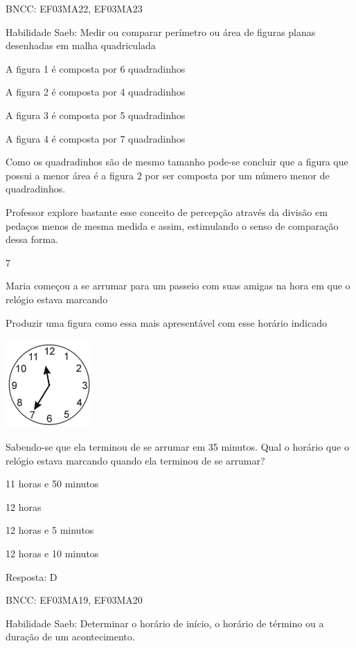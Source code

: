\begin{escolha}
BNCC: EF03MA22, EF03MA23

Habilidade Saeb: Medir ou comparar perímetro ou área de figuras planas
desenhadas em malha quadriculada

A figura 1 é composta por 6 quadradinhos

A figura 2 é composta por 4 quadradinhos

A figura 3 é composta por 5 quadradinhos

A figura 4 é composta por 7 quadradinhos

Como os quadradinhos são de mesmo tamanho pode-se concluir que a figura
que possui a menor área é a figura 2 por ser composta por um número
menor de quadradinhos.

Professor explore bastante esse conceito de percepção através da divisão
em pedaços menos de mesma medida e assim, estimulando o senso de
comparação dessa forma.

\num{7}

Maria começou a se arrumar para um passeio com suas amigas na hora em
que o relógio estava marcando

Produzir uma figura como essa mais apresentável com esse horário
indicado

\includegraphics[width=1.29487in,height=1.32633in]{media/image134.png}

Sabendo-se que ela terminou de se arrumar em 35 minutos. Qual o horário
que o relógio estava marcando quando ela terminou de se arrumar?

\begin{escolha}

\item
  11 horas e 50 minutos
\item
  12 horas
\item
  12 horas e 5 minutos
\item
  12 horas e 10 minutos
\end{escolha}

Resposta: D

BNCC: EF03MA19, EF03MA20

Habilidade Saeb: Determinar o horário de início, o horário de término ou
a duração de um acontecimento.


\end{escolha}
